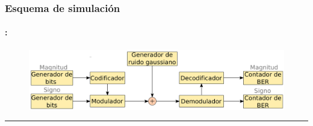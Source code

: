 \begin{frame}
  \frametitle{\textbf{Esquema de simulación}}
\framesubtitle{\secname : \subsecname}

  \begin{figure}[!t] \centering
    \includegraphics[width=0.85\paperwidth]{Diagramas/proyect_alto_nivel.png}%
  \end{figure}
  
  \vspace{-0.5cm}
  \noindent\rule{8cm}{0.4pt}\centering
  \vspace{-0.3cm}


\end{frame}

